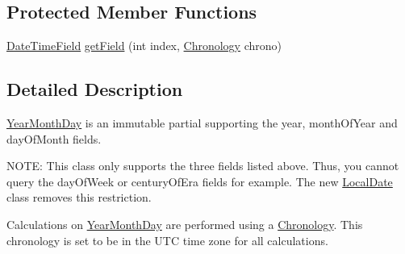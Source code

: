 \subsection*{Protected Member Functions}
\begin{DoxyCompactItemize}
\item 
\hyperlink{classorg_1_1joda_1_1time_1_1_date_time_field}{Date\-Time\-Field} \hyperlink{classorg_1_1joda_1_1time_1_1_year_month_day_a2172b4058f149954f8a0533d9e557890}{get\-Field} (int index, \hyperlink{classorg_1_1joda_1_1time_1_1_chronology}{Chronology} chrono)
\end{DoxyCompactItemize}


\subsection{Detailed Description}
\hyperlink{classorg_1_1joda_1_1time_1_1_year_month_day}{Year\-Month\-Day} is an immutable partial supporting the year, month\-Of\-Year and day\-Of\-Month fields. 

N\-O\-T\-E\-: This class only supports the three fields listed above. Thus, you cannot query the day\-Of\-Week or century\-Of\-Era fields for example. The new {\ttfamily \hyperlink{classorg_1_1joda_1_1time_1_1_local_date}{Local\-Date}} class removes this restriction. 

Calculations on \hyperlink{classorg_1_1joda_1_1time_1_1_year_month_day}{Year\-Month\-Day} are performed using a \hyperlink{classorg_1_1joda_1_1time_1_1_chronology}{Chronology}. This chronology is set to be in the U\-T\-C time zone for all calculations. 

